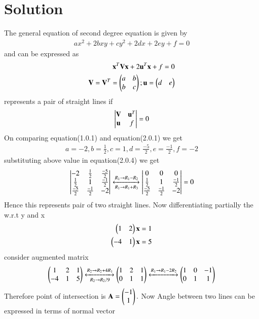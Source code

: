 \documentclass[journal,12pt,twocolumn]{IEEEtran}
\begin{document}
\section{Solution}
The general equation of second degree equation is given by
\begin{align}
ax^2+2bxy+cy^2+2dx+2ey+f=0
\end{align}
and can be expressed as
\begin{align}
\mathbf{x}^T\mathbf{V}\mathbf{x}+2\mathbf{u}^T\mathbf{x}+f=0 \\
\mathbf{V}=\mathbf{V}^T=\begin{pmatrix}a & b \\ b & c\end{pmatrix} ;
\mathbf{u}=\begin{pmatrix}d & e\end{pmatrix}
\end{align}
represents a pair of straight lines if
\begin{align}
\begin{vmatrix}
\mathbf{V}&\mathbf{u}^T\\
\mathbf{u}&f\end{vmatrix} = 0
\end{align}
On comparing equation(1.0.1) and equation(2.0.1) we get
\begin{align}
a=-2,b=\frac{1}{2},c=1,d=\frac{-5}{2},e=\frac{-1}{2},f=-2
\end{align}
substituting above value in equation(2.0.4) we get
\begin{align}
\begin{vmatrix}
-2&\frac{1}{2}&\frac{-5}{2}\\
\frac{1}{2}&1&\frac{-1}{2}\\
\frac{-5}{2}&\frac{-1}{2}&-2\end{vmatrix}
\xleftrightarrow[R_1\rightarrow R_1+R_3]{R_1\rightarrow R_1-R_2}
\begin{vmatrix}
0&0&0\\
\frac{1}{2}&1&\frac{-1}{2}\\
\frac{-5}{2}&\frac{-1}{2}&-2\end{vmatrix}=0
\end{align}
Hence this represents pair of  two straight lines.
Now differentiating partially the  w.r.t y and x
\begin{align}
    \begin{pmatrix}1&2\end{pmatrix}\mathbf{x} = 1\\
    \begin{pmatrix}-4&1\end{pmatrix}\mathbf{x}=5
\end{align}
consider augmented matrix
\begin{align}
    \begin{pmatrix}1&2&1\\-4&1&5\end{pmatrix}
    \xleftrightarrow[R_2\rightarrow R_2/9]{R_2\rightarrow R_2+4R_1}
    \begin{pmatrix}1&2&1\\0&1&1\end{pmatrix}\xleftrightarrow{R_1\rightarrow R_1-2R_2}
    \begin{pmatrix}1&0&-1\\0&1&1\end{pmatrix}
\end{align}
Therefore point of intersection is $\mathbf{A}=\begin{pmatrix}-1\\1\end{pmatrix}.$
Now Angle between two lines can be expressed in terms of normal vector
\end{document}
